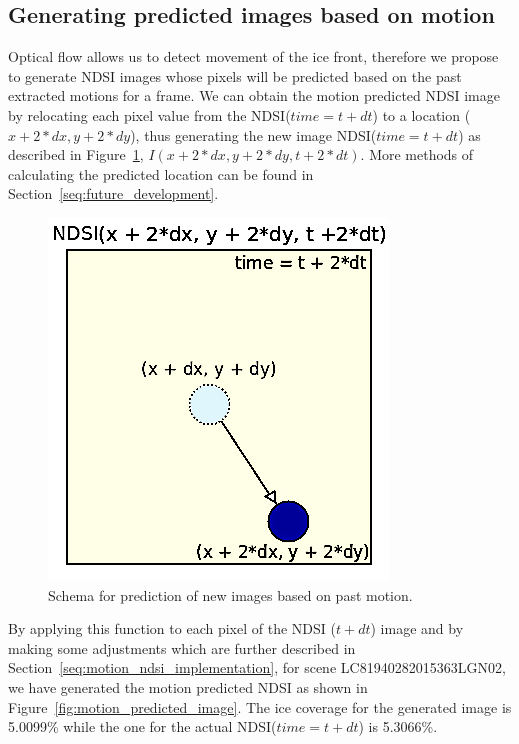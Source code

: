 \documentclass[12pt, a4paper]{report}
\begin{document}
	\subsection{Generating predicted images based on motion}
	\label{seq:motion_ndsi_functional}
	
	\par Optical flow allows us to detect movement of the ice front, therefore we propose to generate NDSI images whose pixels will be predicted based on the past extracted motions for a frame. We can obtain the motion predicted NDSI image by relocating each pixel value from
	the NDSI(\(time=t+dt\)) to a location (\(x + 2*dx, y + 2*dy\)), thus generating the new image NDSI(\(time=t+dt\)) as described in Figure~\ref{fig:motion_generated_schema}, \(I(x + 2*dx, y + 2*dy, t + 2*dt)\). More methods of calculating the predicted location can be found in Section~\ref{seq:future_development}.
	
	\begin{figure}[h]
		\centering
		\includegraphics[scale = 0.6]{../images/motion_generated_schema.png}
		\caption{Schema for prediction of new images based on past motion.}
		\label{fig:motion_generated_schema}
	\end{figure}

	\par By applying this function to each pixel of the NDSI (\(t + dt\)) image and by making some adjustments which are further described in Section~\ref{seq:motion_ndsi_implementation}, for scene LC81940282015363LGN02, we have generated the motion predicted NDSI as shown in Figure~\ref{fig:motion_predicted_image}. The ice coverage for the generated image is 5.0099\% while the one for the actual NDSI(\(time=t+dt\)) is 5.3066\%.
	
\end{document}
